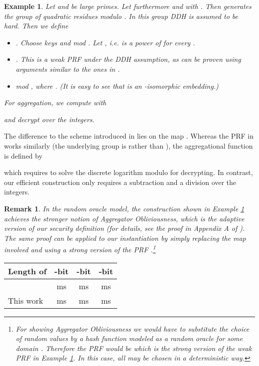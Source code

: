 \documentclass[10pt]{extarticle}
\newtheorem{Exm}{Example}
\newtheorem{Rem}{Remark}
\begin{document}
\begin{Exm}\label{DDHEXM} Let  and  be large primes. Let furthermore  and  with . Then  generates the group  of quadratic residues modulo . In this group DDH is assumed to be hard. Then we define 
\begin{itemize}
\item . Choose keys  and  mod . Let , i.e.  is a power of  for every .
\item . This is a weak PRF under the DDH assumption, as can be proven using arguments similar to the ones in . \item  mod , where . (It is easy to see that  is an -isomorphic embedding.)
\end{itemize}

\noindent For aggregation, we compute  with

and decrypt  over the integers.
\end{Exm}

The difference to the scheme introduced in \cite{2} lies on the map . Whereas the PRF in \cite{2} works similarly (the underlying group  is  rather than ), the aggregational function is defined by

which requires to solve the discrete logarithm modulo  for decrypting. In contrast, our efficient construction only requires a subtraction and a division over the integers.

\begin{Rem} In the random oracle model, the construction shown in Example \ref{DDHEXM} achieves the stronger notion of Aggregator Obliviousness, which is the adaptive version of our security definition (for details, see the proof in Appendix A of ). The same proof can be applied to our instantiation by simply replacing the map  involved and using a strong version of the PRF .\footnote{For showing Aggregator Obliviousness we would have to substitute the choice of random values  by a hash function  modeled as a random oracle for some domain . Therefore the PRF would be  which is the strong version of the weak PRF in Example \ref{DDHEXM}. In this case, all  may be chosen in a deterministic way.}
\end{Rem}


\begin{table}[t]
\centering
\begin{tabular}{l||c|c|c} Length of  & -bit & -bit & -bit\\ \hline \cite{2} &  ms &  ms &  ms\\ This work &  ms &  ms &  ms
\end{tabular}
\label{enctab}
\end{table}
\end{document}

